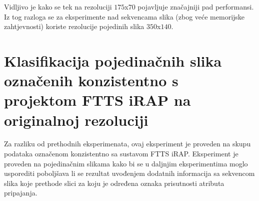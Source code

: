 \documentclass[times, utf8, diplomski, numeric]{fer}
\begin{document}
Vidljivo je kako se tek na rezoluciji $175$x$70$ pojavljuje značajniji pad performansi. 
Iz tog razloga se za eksperimente nad sekvencama slika (zbog veće memorijske zahtjevnosti) koriste rezolucije pojedinih slika $350$x$140$.

\section{Klasifikacija pojedinačnih slika označenih konzistentno s projektom FTTS iRAP na originalnoj rezoluciji}
Za razliku od prethodnih eksperimenata, ovaj eksperiment je proveden na skupu podataka označenom konzistentno sa sustavom FTTS iRAP.
Eksperiment je proveden na pojedinačnim slikama kako bi se u daljnjim eksperimentima moglo usporediti poboljšava li se rezultat uvođenjem dodatnih informacija sa sekvencom slika koje prethode slici za koju je određena oznaka prisutnosti atributa pripajanja.
\end{document}
